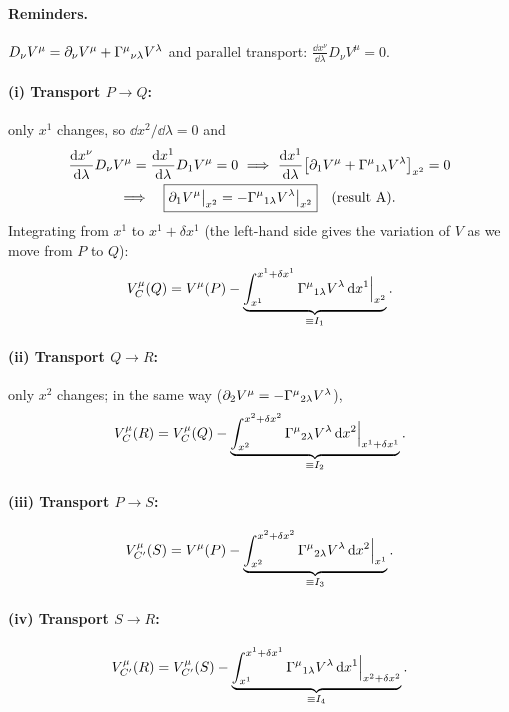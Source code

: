 \paragraph{Reminders.} $D_\nu V^\mu=\partial_\nu V^\mu+\Gamma^{\mu}{}_{\nu\lambda}V^\lambda$ and parallel transport: $\frac{\dd x^\nu}{\dd\lambda}D_\nu V^\mu=0$.

\paragraph{(i) Transport $P\to Q$:} only $x^1$ changes, so $\dd x^2/\dd\lambda=0$ and
\begin{gather*}
  \frac{\mathrm{d} x^\nu}{\mathrm{d}\lambda}D_\nu V^\mu=\frac{\mathrm{d} x^1}{\mathrm{d}\lambda}D_1V^\mu=0\ \Longrightarrow\ \frac{\mathrm{d} x^1}{\mathrm{d}\lambda}\big[\partial_1V^\mu+\Gamma^{\mu}{}_{1\lambda}V^\lambda\big]_{x^2}=0\\
  \Longrightarrow\quad \boxed{\partial_1V^\mu\big|_{x^2}=-\Gamma^{\mu}{}_{1\lambda}V^\lambda\big|_{x^2}}\quad\text{(result A)}.
\end{gather*}
Integrating from $x^1$ to $x^1+\delta x^1$ (the left-hand side gives the variation of $V$ as we move from $P$ to $Q$):
\begin{equation}
  V_C^\mu(Q)=V^\mu(P)-\underbrace{\int_{x^1}^{x^1+\delta x^1}\Gamma^{\mu}{}_{1\lambda}V^\lambda\,\mathrm{d} x^1\Big|_{x^2}}_{\equiv I_1}.
\end{equation}
\paragraph{(ii) Transport $Q\to R$:} only $x^2$ changes; in the same way ($\partial_2V^\mu=-\Gamma^{\mu}{}_{2\lambda}V^\lambda$),
\begin{equation}
  V_C^\mu(R)=V_C^\mu(Q)-\underbrace{\int_{x^2}^{x^2+\delta x^2}\Gamma^{\mu}{}_{2\lambda}V^\lambda\,\mathrm{d} x^2\Big|_{x^1+\delta x^1}}_{\equiv I_2}.
\end{equation}
\paragraph{(iii) Transport $P\to S$:}
\begin{equation}
  V_{C'}^\mu(S)=V^\mu(P)-\underbrace{\int_{x^2}^{x^2+\delta x^2}\Gamma^{\mu}{}_{2\lambda}V^\lambda\,\mathrm{d} x^2\Big|_{x^1}}_{\equiv I_3}.
\end{equation}
\paragraph{(iv) Transport $S\to R$:}
\begin{equation}
  V_{C'}^\mu(R)=V_{C'}^\mu(S)-\underbrace{\int_{x^1}^{x^1+\delta x^1}\Gamma^{\mu}{}_{1\lambda}V^\lambda\,\mathrm{d} x^1\Big|_{x^2+\delta x^2}}_{\equiv I_4}.
\end{equation}

